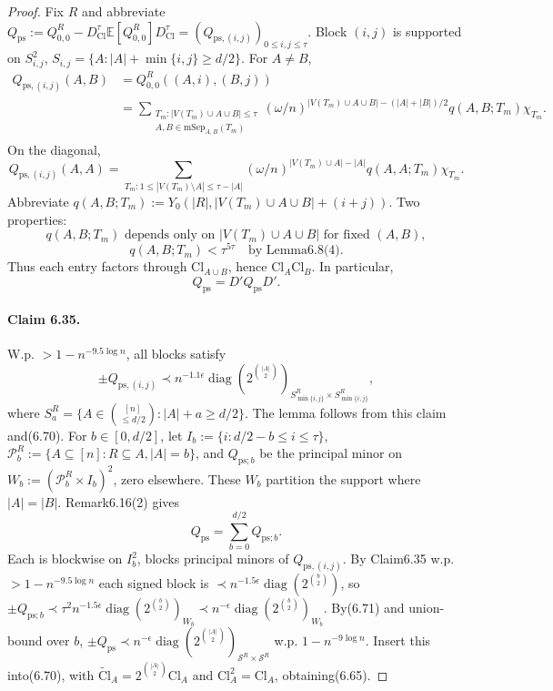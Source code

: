 \begin{proof}Fix $R$ and abbreviate $Q_{\mathrm{ps}}:=Q_{0,0}^R-D_{\mathrm{Cl}}^\tau\mathbb E[Q_{0,0}^R]D_{\mathrm{Cl}}^\tau=(Q_{\mathrm{ps},(i,j)})_{0\le i,j\le\tau}$. Block $(i,j)$ is supported on $S_{i,j}^2$, $S_{i,j}=\{A:|A|+\min\{i,j\}\ge d/2\}$. For $A\ne B$,
\begin{align*}Q_{\mathrm{ps},(i,j)}(A,B)&=Q_{0,0}^R((A,i),(B,j))\\&=\sum_{\substack{T_m:|V(T_m)\cup A\cup B|\le\tau\\A,B\in\mathrm{mSep}_{A,B}(T_m)}}(\omega/n)^{|V(T_m)\cup A\cup B|-(|A|+|B|)/2}q(A,B;T_m)\chi_{T_m}.\tag{6.66}\end{align*}
On the diagonal,
\[Q_{\mathrm{ps},(i,j)}(A,A)=\sum_{T_m:1\le|V(T_m)\setminus A|\le\tau-|A|}(\omega/n)^{|V(T_m)\cup A|-|A|}q(A,A;T_m)\chi_{T_m}.\tag{6.67}\]
Abbreviate $q(A,B;T_m):=Y_0(|R|,|V(T_m)\cup A\cup B|+(i+j))$. Two properties:
\[q(A,B;T_m)\text{ depends only on }|V(T_m)\cup A\cup B|\text{ for fixed }(A,B),\tag{6.68}\]
\[q(A,B;T_m)<\tau^{5\tau}\quad\text{by Lemma6.8(4)}.\tag{6.69}\]
Thus each entry factors through $\mathrm{Cl}_{A\cup B}$, hence $\mathrm{Cl}_A\mathrm{Cl}_B$. In particular,
\[Q_{\mathrm{ps}}=D'Q_{\mathrm{ps}}D'.\tag{6.70}\]
\paragraph{Claim 6.35.} W.p. $>1-n^{-9.5\log n}$, all blocks satisfy
\[\pm Q_{\mathrm{ps},(i,j)}\prec n^{-1.1\epsilon}\operatorname{diag}(2^{\binom{|A|}2})_{S^R_{\min\{i,j\}}\times S^R_{\min\{i,j\}}},\]
where $S_a^R=\{A\in\binom{[n]}{\le d/2}:|A|+a\ge d/2\}$.
The lemma follows from this claim and(6.70). For $b\in[0,d/2]$, let $I_b:=\{i:d/2-b\le i\le\tau\}$, $\mathcal P_b^R:=\{A\subseteq[n]:R\subseteq A,|A|=b\}$, and $Q_{\mathrm{ps};b}$ be the principal minor on $W_b:=(\mathcal P_b^R\times I_b)^2$, zero elsewhere. These $W_b$ partition the support where $|A|=|B|$. Remark6.16(2) gives
\[Q_{\mathrm{ps}}=\sum_{b=0}^{d/2}Q_{\mathrm{ps};b}.\tag{6.71}\]
Each is blockwise on $I_b^2$, blocks principal minors of $Q_{\mathrm{ps},(i,j)}$. By Claim6.35 w.p. $>1-n^{-9.5\log n}$ each signed block is $\prec n^{-1.5\epsilon}\operatorname{diag}(2^{\binom b2})$, so $\pm Q_{\mathrm{ps};b}\prec\tau^2n^{-1.5\epsilon}\operatorname{diag}(2^{\binom b2})_{W_b}\prec n^{-\epsilon}\operatorname{diag}(2^{\binom b2})_{W_b}$. By(6.71) and union-bound over $b$, $\pm Q_{\mathrm{ps}}\prec n^{-\epsilon}\operatorname{diag}(2^{\binom{|A|}2})_{\mathcal S^R\times\mathcal S^R}$ w.p. $1-n^{-9\log n}$. Insert this into(6.70), with $\widetilde{\mathrm{Cl}}_A=2^{\binom{|A|}2}\mathrm{Cl}_A$ and $\mathrm{Cl}_A^2=\mathrm{Cl}_A$, obtaining(6.65).\end{proof}

